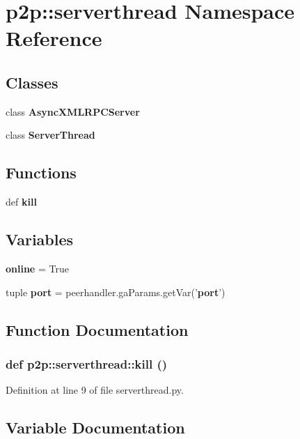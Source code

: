 \section{p2p::serverthread Namespace Reference}
\label{namespacep2p_1_1serverthread}


\subsection*{Classes}
\begin{CompactItemize}
\item 
class {\bf AsyncXMLRPCServer}
\item 
class {\bf ServerThread}
\end{CompactItemize}
\subsection*{Functions}
\begin{CompactItemize}
\item 
def {\bf kill}
\end{CompactItemize}
\subsection*{Variables}
\begin{CompactItemize}
\item 
{\bf online} = True
\item 
tuple {\bf port} = peerhandler.gaParams.getVar('{\bf port}')
\end{CompactItemize}


\subsection{Function Documentation}
\subsubsection{\setlength{\rightskip}{0pt plus 5cm}def p2p::serverthread::kill ()}\label{namespacep2p_1_1serverthread_9cedb67af92b14ee77c99709f2e2bbb8}




Definition at line 9 of file serverthread.py.

\subsection{Variable Documentation}
